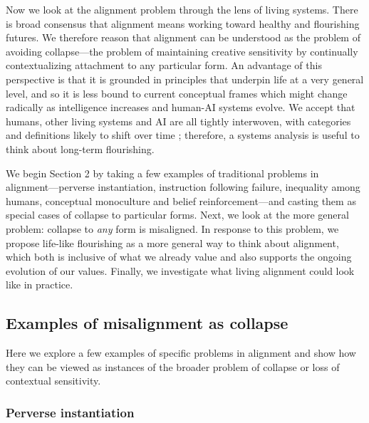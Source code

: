 \documentclass[11pt]{article}
\begin{document}

Now we look at the alignment problem through the lens of living systems. There is broad consensus that alignment means working toward healthy and flourishing futures. We therefore reason that alignment can be understood as the problem of avoiding collapse---the problem of maintaining creative sensitivity by continually contextualizing attachment to any particular form. An advantage of this perspective is that it is grounded in principles that underpin life at a very general level, and so it is less bound to current conceptual frames which might change radically as intelligence increases and human-AI systems evolve. We accept that humans, other living systems and AI are all tightly interwoven, with categories and definitions likely to shift over time \citep{latour2012we, haraway2020staying, hayles2000we, bateson1972steps, folke2006resilience, douglas2012social}; therefore, a systems analysis is useful to think about long-term flourishing.

We begin Section 2 by taking a few examples of traditional problems in alignment---perverse instantiation, instruction following failure, inequality among humans, conceptual monoculture and belief reinforcement---and casting them as special cases of collapse to particular forms. Next, we look at the more general problem: collapse to \textit{any} form is misaligned. In response to this problem, we propose life-like flourishing as a more general way to think about alignment, which both is inclusive of what we already value and also supports the ongoing evolution of our values. Finally, we investigate what living alignment could look like in practice.



\subsection{Examples of misalignment as collapse}

Here we explore a few examples of specific problems in alignment and show how they can be viewed as instances of the broader problem of collapse or loss of contextual sensitivity.

\subsubsection{Perverse instantiation}
\end{document}

